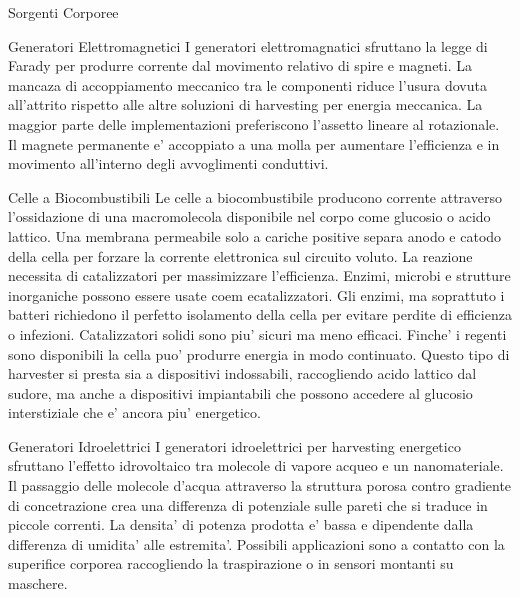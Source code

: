\begin{multicols}{2}
\begin{section}{Sorgenti Corporee}
   \begin{subsection}{Generatori Elettromagnetici}
    I generatori elettromagnatici sfruttano la legge di Farady per produrre corrente dal movimento relativo di spire e magneti. La mancaza di accoppiamento meccanico tra le componenti riduce l'usura dovuta all'attrito rispetto alle altre soluzioni di harvesting per energia meccanica. La maggior parte delle implementazioni preferiscono l'assetto lineare al rotazionale. Il magnete permanente e' accoppiato a una molla per aumentare l'efficienza e in movimento all'interno degli avvoglimenti conduttivi.
   \end{subsection}
   
   \begin{subsection}{Celle a Biocombustibili}
    Le celle a biocombustibile producono corrente attraverso l'ossidazione di una macromolecola disponibile nel corpo come glucosio o acido lattico. Una membrana permeabile solo a cariche positive separa anodo e catodo della cella per forzare la corrente elettronica sul circuito voluto. La reazione necessita di catalizzatori per massimizzare l'efficienza. Enzimi, microbi e strutture inorganiche possono essere usate coem ecatalizzatori. Gli enzimi, ma soprattuto i batteri richiedono il perfetto isolamento della cella per evitare perdite di efficienza o infezioni. Catalizzatori solidi sono piu' sicuri ma meno efficaci. Finche' i regenti sono disponibili la cella puo' produrre energia in modo continuato. Questo tipo di harvester si presta sia a dispositivi indossabili, raccogliendo acido lattico dal sudore, ma anche a dispositivi impiantabili che possono accedere al glucosio interstiziale che e' ancora piu' energetico. 
   \end{subsection}

   \begin{subsection}{Generatori Idroelettrici}
    I generatori idroelettrici per harvesting energetico sfruttano l'effetto idrovoltaico tra molecole di vapore acqueo e un nanomateriale. Il passaggio delle molecole d'acqua attraverso la struttura porosa contro gradiente di concetrazione crea una differenza di potenziale sulle pareti che si traduce in piccole correnti. La densita' di potenza prodotta e' bassa e dipendente dalla differenza di umidita' alle estremita'. Possibili applicazioni sono a contatto con la superifice corporea raccogliendo la traspirazione o in sensori montanti su maschere. 
   \end{subsection}
\end{section}



\end{multicols}
